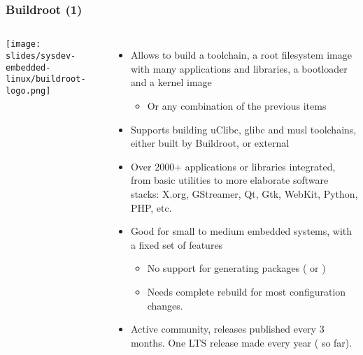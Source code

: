\begin{frame}
  \frametitle{Buildroot (1)}
  \begin{columns}
    \texttt{[image: slides/sysdev-embedded-linux/buildroot-logo.png]}
       \begin{itemize}
       \item Allows to build a toolchain, a root filesystem image with many
         applications and libraries, a bootloader and a kernel image
         \begin{itemize}
         \item Or any combination of the previous items
         \end{itemize}
       \item Supports building uClibc, glibc and musl toolchains,
         either built by Buildroot, or external
       \item Over 2000+ applications or libraries integrated, from basic
         utilities to more elaborate software stacks: X.org, GStreamer, Qt,
         Gtk, WebKit, Python, PHP, etc.
       \item Good for small to medium embedded systems, with a fixed set of
         features
         \begin{itemize}
         \item No support for generating packages ( or
           )
         \item Needs complete rebuild for most configuration changes.
         \end{itemize}
       \item Active community, releases published every 3 months. One LTS
             release made every year ( so far).
       \end{itemize}
  \end{columns}
\end{frame}

